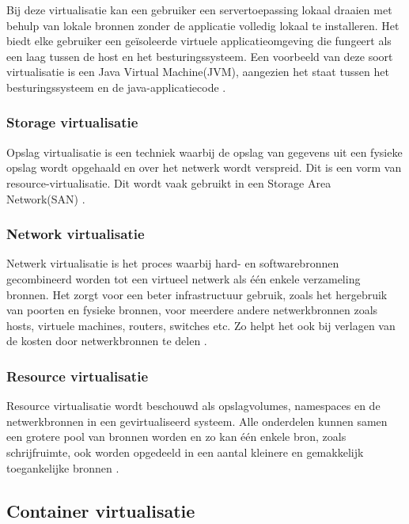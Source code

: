 Bij deze virtualisatie kan een gebruiker een servertoepassing lokaal draaien met behulp van lokale bronnen zonder de applicatie volledig lokaal te installeren. Het biedt elke gebruiker een geïsoleerde virtuele applicatieomgeving die fungeert als een laag tussen de host en het besturingssysteem. Een voorbeeld van deze soort virtualisatie is een Java Virtual Machine(JVM), aangezien het staat tussen het besturingssysteem en de java-applicatiecode \autocite{Kedia2013}. 

\subsubsection{Storage virtualisatie}

Opslag virtualisatie is een techniek waarbij de opslag van gegevens uit een fysieke opslag wordt opgehaald en over het netwerk wordt verspreid. Dit is een vorm van resource-virtualisatie. Dit wordt vaak gebruikt in een Storage Area Network(SAN) \autocite{Kedia2013}.

\subsubsection{Network virtualisatie}

Netwerk virtualisatie is het proces waarbij hard- en softwarebronnen gecombineerd worden tot een virtueel netwerk als één enkele verzameling bronnen. Het zorgt voor een beter infrastructuur gebruik, zoals het hergebruik van poorten en fysieke bronnen, voor meerdere andere netwerkbronnen zoals hosts, virtuele machines, routers, switches etc. Zo helpt het ook bij verlagen van de kosten door netwerkbronnen te delen \autocite{Kedia2013}.

\subsubsection{Resource virtualisatie}

Resource virtualisatie wordt beschouwd als opslagvolumes, namespaces en de netwerkbronnen in een gevirtualiseerd systeem. Alle onderdelen kunnen samen een grotere pool van bronnen worden en zo kan één enkele bron, zoals schrijfruimte, ook worden opgedeeld in een aantal kleinere en gemakkelijk toegankelijke bronnen \autocite{Kedia2013}.

\subsection{Container virtualisatie}

